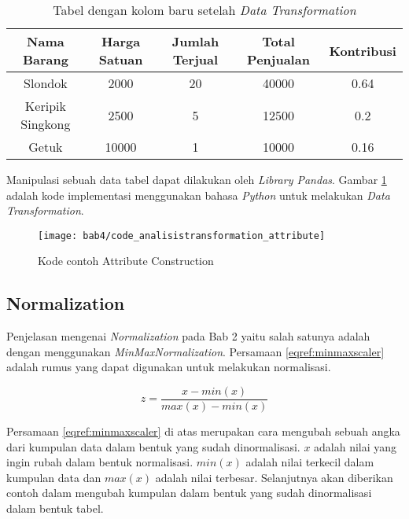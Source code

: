 \begin{table}[H]
\caption{Tabel dengan kolom baru setelah \textit{Data Transformation}}
\centering
\begin{tabular}{|c|c|c|c|c|}
  \hline 
  \textbf{Nama Barang} & \textbf{Harga Satuan} &\textbf{ Jumlah Terjual} & \textbf{Total Penjualan} & \textbf{Kontribusi }\\ 
  \hline 
  Slondok & 2000 & 20 & 40000 & 0.64 \\ 
  \hline 
  Keripik Singkong & 2500 & 5 & 12500 & 0.2 \\ 
  \hline 
  Getuk & 10000 & 1 & 10000 & 0.16 \\ 
  \hline 
  \end{tabular}   
  \label{tab:TabelSesudahDataTransformation}
\end{table} 

Manipulasi sebuah data tabel dapat dilakukan oleh \textit{Library Pandas}. Gambar \ref{fig:code_analisistransformation_attribute} adalah kode implementasi menggunakan bahasa \textit{Python} untuk melakukan \textit{Data Transformation}.


\begin{figure}[H]
	\centering  
	\texttt{[image: bab4/code\_analisistransformation\_attribute]}   
	\caption{Kode contoh Attribute Construction}
	\label{fig:code_analisistransformation_attribute} 
\end{figure} 

\subsection{Normalization}

Penjelasan mengenai \textit{Normalization} pada Bab 2 yaitu salah satunya adalah dengan menggunakan \textit{MinMaxNormalization}. Persamaan \eqref{eqref:minmaxscaler} adalah rumus yang dapat digunakan untuk melakukan normalisasi.

\begin{equation}
z = \frac{x - min(x)}{max(x) - min(x)} 
\label{eqref:minmaxscaler}
\end{equation}

Persamaan \eqref{eqref:minmaxscaler} di atas merupakan cara mengubah sebuah angka dari kumpulan data dalam bentuk yang sudah dinormalisasi. $x$ adalah nilai yang ingin rubah dalam bentuk normalisasi. $min(x)$ adalah nilai terkecil dalam kumpulan data dan $max(x)$ adalah nilai terbesar. Selanjutnya akan diberikan contoh dalam mengubah kumpulan dalam bentuk yang sudah dinormalisasi dalam bentuk tabel.

